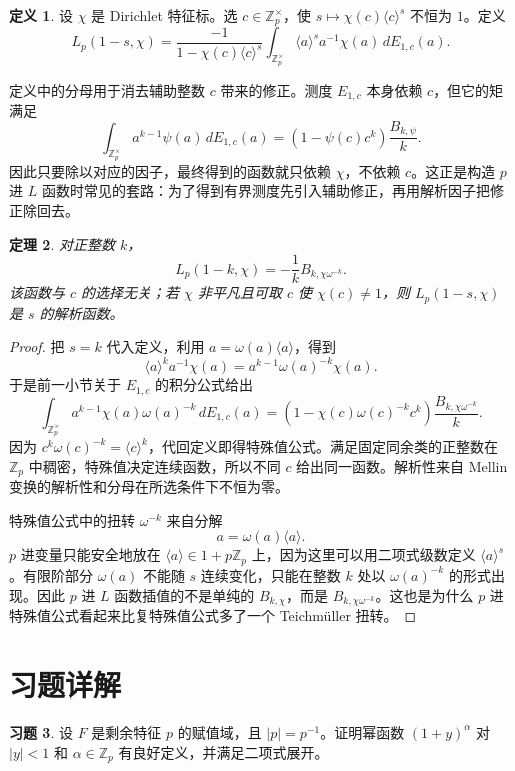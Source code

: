 \documentclass[11pt,a4paper,openany]{ctexbook}
\numberwithin{equation}{chapter}
\newcommand{\Z}{\mathbb{Z}}
\theoremstyle{plain}
\newtheorem{theorem}{定理}[chapter]
\theoremstyle{definition}
\newtheorem{definition}[theorem]{定义}
\newtheorem{exercise}[theorem]{习题}
\theoremstyle{remark}
\begin{document}
\begin{definition}
设 $\chi$ 是 Dirichlet 特征标。选 $c\in\Z_p^\times$，使 $s\mapsto \chi(c)\langle c\rangle^s$ 不恒为 $1$。定义
\[
  L_p(1-s,\chi)=
  \frac{-1}{1-\chi(c)\langle c\rangle^s}
  \int_{\Z_p^\times}\langle a\rangle^s a^{-1}\chi(a)\,dE_{1,c}(a).
\]
\end{definition}

定义中的分母用于消去辅助整数 $c$ 带来的修正。测度 $E_{1,c}$ 本身依赖 $c$，但它的矩满足
\[
\int_{\Z_p^\times} a^{k-1}\psi(a)\,dE_{1,c}(a)
  =(1-\psi(c)c^k)\frac{B_{k,\psi}}{k}.
\]
因此只要除以对应的因子，最终得到的函数就只依赖 $\chi$，不依赖 $c$。这正是构造 $p$ 进 $L$ 函数时常见的套路：为了得到有界测度先引入辅助修正，再用解析因子把修正除回去。

\begin{theorem}
对正整数 $k$，
\[
  L_p(1-k,\chi)=-\frac{1}{k}B_{k,\chi\omega^{-k}}.
\]
该函数与 $c$ 的选择无关；若 $\chi$ 非平凡且可取 $c$ 使 $\chi(c)\ne1$，则 $L_p(1-s,\chi)$ 是 $s$ 的解析函数。
\end{theorem}

\begin{proof}
把 $s=k$ 代入定义，利用 $a=\omega(a)\langle a\rangle$，得到
\[
  \langle a\rangle^k a^{-1}\chi(a)
  =a^{k-1}\omega(a)^{-k}\chi(a).
\]
于是前一小节关于 $E_{1,c}$ 的积分公式给出
\[
  \int_{\Z_p^\times}a^{k-1}\chi(a)\omega(a)^{-k}\,dE_{1,c}(a)
  =(1-\chi(c)\omega(c)^{-k}c^k)\frac{B_{k,\chi\omega^{-k}}}{k}.
\]
因为 $c^k\omega(c)^{-k}=\langle c\rangle^k$，代回定义即得特殊值公式。满足固定同余类的正整数在 $\Z_p$ 中稠密，特殊值决定连续函数，所以不同 $c$ 给出同一函数。解析性来自 Mellin 变换的解析性和分母在所选条件下不恒为零。

特殊值公式中的扭转 $\omega^{-k}$ 来自分解
\[
a=\omega(a)\langle a\rangle.
\]
$p$ 进变量只能安全地放在 $\langle a\rangle\in1+p\Z_p$ 上，因为这里可以用二项式级数定义 $\langle a\rangle^s$。有限阶部分 $\omega(a)$ 不能随 $s$ 连续变化，只能在整数 $k$ 处以 $\omega(a)^{-k}$ 的形式出现。因此 $p$ 进 $L$ 函数插值的不是单纯的 $B_{k,\chi}$，而是 $B_{k,\chi\omega^{-k}}$。这也是为什么 $p$ 进特殊值公式看起来比复特殊值公式多了一个 Teichmüller 扭转。
\end{proof}

\section{习题详解}

\begin{exercise}
设 $F$ 是剩余特征 $p$ 的赋值域，且 $|p|=p^{-1}$。证明幂函数 $(1+y)^\alpha$ 对 $|y|<1$ 和 $\alpha\in\Z_p$ 有良好定义，并满足二项式展开。
\end{exercise}
\end{document}
